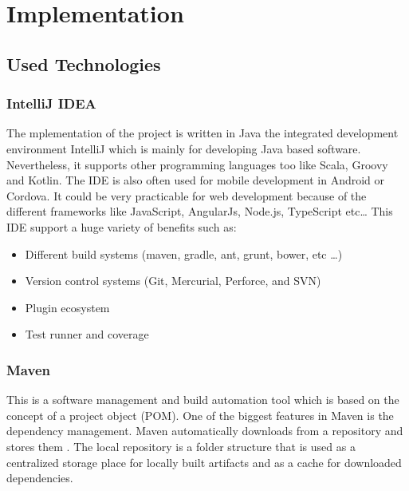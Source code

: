 \chapter{Implementation}

\lstset{language=NoBeardAsm}
\section{Used Technologies}
\subsection{IntelliJ IDEA} 
The mplementation of the project is written in Java  the integrated development environment IntelliJ which is mainly for developing Java based software. Nevertheless, it supports other programming languages too like Scala, Groovy and Kotlin. The IDE is also often used for mobile development in Android or Cordova. It could be very practicable for web development because of the different frameworks like JavaScript, AngularJs, Node.js, TypeScript etc… 
This IDE support a huge variety of benefits such as:
\begin{itemize}
\item Different build systems (maven, gradle, ant, grunt, bower, etc \ldots)
\item Version control systems (Git, Mercurial, Perforce, and SVN)
\item Plugin ecosystem
\item Test runner and coverage
\end{itemize}

\subsection{Maven} \label{sec:maven}
This is a software management and build automation tool which is based on the concept of a project object  (POM).  One of the biggest features in Maven is the dependency management. Maven automatically downloads  from a repository and stores them . The local repository  is a folder structure that is used as a centralized storage place for locally built artifacts and as a cache for downloaded dependencies.

